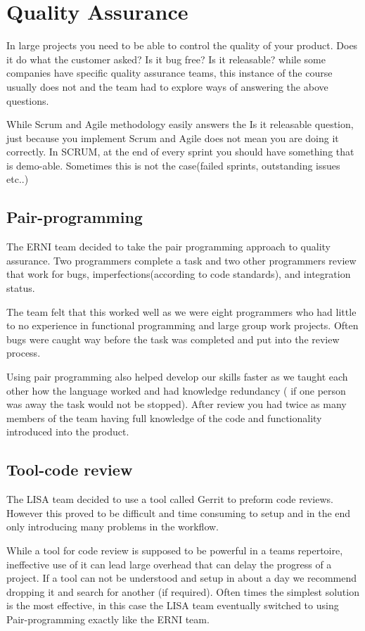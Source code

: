 \section {Quality Assurance}

In large projects you need to be able to control the quality of your product. Does it do what the customer asked? Is it bug free? Is it releasable? while some companies have specific quality assurance teams, this instance of the course usually does not and the team had to explore ways of answering the above questions.

While Scrum and Agile methodology easily answers the Is it releasable question, just because you implement Scrum and Agile does not mean you are doing it correctly. In SCRUM, at the end of every sprint you should have something that is demo-able. Sometimes this is not the case(failed sprints, outstanding issues etc..)

\subsection{Pair-programming}

The ERNI team decided to take the pair programming approach to quality assurance. Two programmers complete a task and two other programmers review that work for bugs, imperfections(according to code standards), and integration status. 

The team felt that this worked well as we were eight programmers who had little to no experience in functional programming and large group work projects. Often bugs were caught way before the task was completed and put into the review process. 

Using pair programming also helped develop our skills faster as we taught each other how the language worked and had knowledge redundancy ( if one person was away the task would not be stopped). After review you had twice as many members of the team having full knowledge of the code and functionality introduced into the product.

\subsection{Tool-code review}

The LISA team decided to use a tool called Gerrit to preform code reviews. However this proved to be difficult and time consuming to setup and in the end only introducing many problems in the workflow. 

While a tool for code review is supposed to be powerful in a teams repertoire, ineffective use of it can lead 
large overhead that can delay the progress of a project. If a tool can not be understood and setup in about a day we recommend dropping it and search for another (if required). Often times the simplest solution is the most effective, in this case the LISA team eventually switched to using Pair-programming exactly like the ERNI team.


